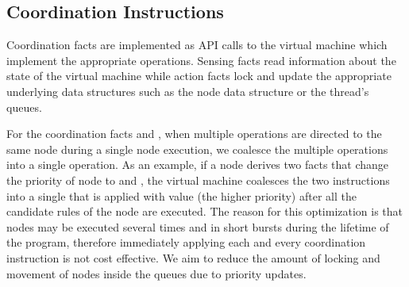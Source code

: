 \subsection{Coordination Instructions}\label{section:coordination:coord_instrs}

Coordination facts are implemented as API calls to the virtual machine which
implement the appropriate operations. Sensing facts read information about the
state of the virtual machine while action facts lock and update the appropriate
underlying data structures such as the node data structure or the thread's
queues.

For the coordination facts  and , when
multiple operations are directed to the same node during a single node
execution, we coalesce the multiple operations into a single operation.  As an
example, if a node derives two  facts that change the
priority of node  to  and , the virtual machine
coalesces the two instructions into a single  that is applied
with value  (the higher priority) after all the candidate rules of the
node are executed. The reason for this optimization is that nodes may be
executed several times and in short bursts during the lifetime of the program,
therefore immediately applying each and every coordination instruction is not
cost effective. We aim to reduce the amount of locking and movement of nodes
inside the queues due to priority updates.
